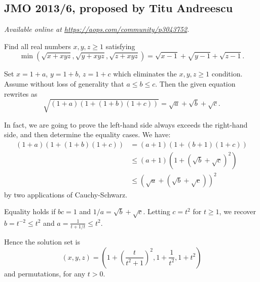 \documentclass[11pt]{scrartcl}
\begin{document}
\subsection{JMO 2013/6, proposed by Titu Andreescu}
\textsl{Available online at \url{https://aops.com/community/p3043752}.}
\begin{mdframed}[style=mdpurplebox,frametitle={Problem statement}]
Find all real numbers $x,y,z \ge 1$ satisfying
\[ \min \left( \sqrt{x+xyz}, \sqrt{y+xyz}, \sqrt{z+xyz} \right)
  = \sqrt{x-1} + \sqrt{y-1} + \sqrt{z-1}. \]
\end{mdframed}
Set $x = 1+a$, $y = 1+b$, $z = 1+c$
which eliminates the $x,y,z \ge 1$ condition.
Assume without loss of generality that $a \leq b \leq c$.
Then the given equation rewrites as
\[ \sqrt{(1+a)\left( 1+(1+b)(1+c) \right)} = \sqrt a + \sqrt b + \sqrt c. \]

In fact, we are going to prove the left-hand side always exceeds the
right-hand side, and then determine the equality cases.
We have:
\begin{align*}
  (1+a)\left( 1 + (1+b)(1+c) \right)
  &= (a+1)\left( 1 + (b+1)(1+c) \right) \\
  &\le (a+1) \left( 1 + \left( \sqrt b + \sqrt c \right)^2 \right) \\
  &\le \left( \sqrt a + \left( \sqrt b + \sqrt c \right) \right)^2
\end{align*}
by two applications of Cauchy-Schwarz.

Equality holds if $bc = 1$ and $1/a = \sqrt b + \sqrt c$.
Letting $c = t^2$ for $t \ge 1$,
we recover $b = t^{-2} \le t^2$ and $a = \frac{1}{t+1/t} \le t^2$.

Hence the solution set is
\[ (x,y,z) = \left( 1 + \left( \frac{t}{t^2+1} \right)^2,
  1 + \frac{1}{t^2}, 1 + t^2 \right) \]
and permutations, for any $t > 0$.
\pagebreak
\end{document}
